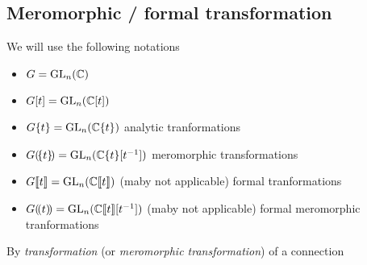 \subsection{Meromorphic / formal transformation}
\begin{comment}\footnotesize
  see \cite{thboalch} \textbf{Rem 1.41 on p. 16}:
  \begin{rem}
    Note that in most of the recent references we have used, Stokes matrices
    are used to classify
    \begin{itemize}
      \item meromorphic connections within fixed \textbf{formal meromorphic
        classes, modulo meromorphic equivalence}.
    \end{itemize}
    Whereas here we classify
    \begin{itemize}
      \item meromorphic connections within fixed \textbf{formal analytic
        classes, modulo analytic equivalence},
    \end{itemize}
    as is done in the older literature.  The fact is that the sets equivalence
    classes are the same in both cases. It is important for us to work with
    analytic, rather than meromorphic gauge transformations, because then the
    $\C^\infty$ viewpoint in Chapter 3 is cleaner. This distinction relates to
    the difference between \textbf{‘regular singular’} connections and
    \textbf{‘logarithmic’} connections.
  \end{rem}
\end{comment}
\begin{notations}
  We will use the following notations
  \begin{itemize}
    \item $G=\operatorname{GL}_n(\mathbb{C})$
    \item $G[t]=\operatorname{GL}_n(\mathbb{C}[t])$
    \item $G\{t\}=\operatorname{GL}_n(\mathbb{C}\{t\})$ analytic tranformations
    \item $G(\!\{t\}\!)=\operatorname{GL}_n(\mathbb{C}\{t\}[t^{-1}])$ meromorphic transformations
    \item $G\llbracket t\rrbracket=\operatorname{GL}_n(\mathbb{C}\llbracket t\rrbracket)$
      (maby not applicable) formal tranformations
    \item $G(\!(t)\!)=\operatorname{GL}_n(\mathbb{C}\llbracket t\rrbracket[t^{-1}])$
      (maby not applicable) formal meromorphic tranformations
  \end{itemize}
\end{notations}
By \emph{transformation} (or \emph{meromorphic transformation}) of a connection
